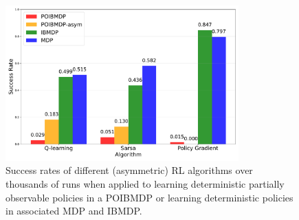 \begin{figure}
    \centering
    \includegraphics[width=0.8\textwidth]{images/images_part1/algorithm_performance_comparison_flattened.pdf}
    \caption{Success rates of different (asymmetric) RL algorithms over thousands of runs when applied to learning deterministic partially observable policies in a POIBMDP or learning deterministic policies in associated MDP and IBMDP.}\label{fig:po-vs-ib}
\end{figure}


